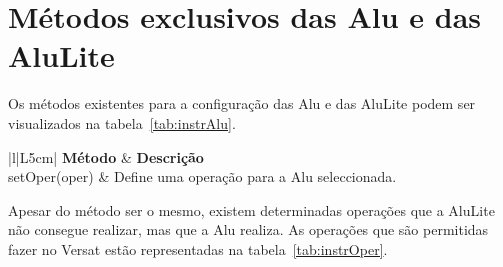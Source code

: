 \section{Métodos exclusivos das Alu e das AluLite }
\label{section:metodos alu}


Os métodos existentes para a configuração das Alu e das AluLite podem ser visualizados na tabela~\ref{tab:instrAlu}.



\begin{table}[h!]
    \caption[Métodos referentes à Alu e à AluLite.]{Métodos referentes à Alu e à AluLite.}
  \begin{center}
    \begin{tabular}{|l|L{5cm}|}
      \hline
       {\bf Método} & {\bf Descrição} \\
      \hline \hline
      setOper(oper) & Define uma operação para a Alu seleccionada. \\
      \hline
    \end{tabular}
  \end{center}
  \label{tab:instrAlu}
\end{table}


Apesar do método ser o mesmo, existem determinadas operações que a AluLite não consegue realizar, mas que a Alu realiza. 
As operações que são permitidas fazer no Versat estão representadas na tabela~\ref{tab:instrOper}.


